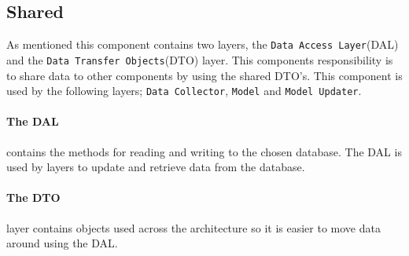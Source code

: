 \subsection{Shared}
As mentioned this component contains two layers, the \texttt{Data Access Layer}(DAL) and the \texttt{Data Transfer Objects}(DTO) layer.
This components responsibility is to share data to other components by using the shared DTO's.
This component is used by the following layers; \texttt{Data Collector}, \texttt{Model} and \texttt{Model Updater}.

\paragraph{The DAL} contains the methods for reading and writing to the chosen database.
The DAL is used by layers to update and retrieve data from the database.

\paragraph{The DTO} layer contains objects used across the architecture so it is easier to move data around using the DAL.